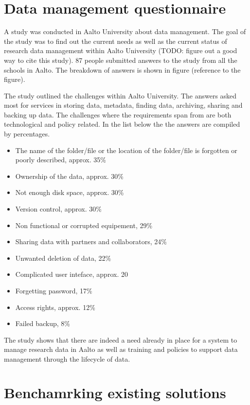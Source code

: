 \section{Data management questionnaire}
\label{sec:questionnaire}

A study was conducted in Aalto University about data management. The goal of
the study was to find out the current needs as well as the current status of
research data management within Aalto University (TODO: figure out a good way
to cite this study). 87 people submitted answers to the study from all the
schools in Aalto. The breakdown of answers is shown in figure (reference to the
figure).

The study outlined the challenges within Aalto University. The answers asked
most for services in storing data, metadata, finding data, archiving, sharing
and backing up data. The challenges where the requirements span from are both
technological and policy related. In the list below the the answers are
compiled by percentages.

\begin{itemize}
    \item The name of the folder/file or the location of the folder/file is
          forgotten or poorly described, approx. 35\%
    \item Ownership of the data, approx. 30\%
    \item Not enough disk space, approx. 30\%
    \item Version control, approx. 30\%
    \item Non functional or corrupted equipement, 29\%
    \item Sharing data with partners and collaborators, 24\%
    \item Unwanted deletion of data, 22\%
    \item Complicated user inteface, approx. 20%
    \item Forgetting password, 17\%
    \item Access rights, approx. 12\%
    \item Failed backup, 8\%
\end{itemize}

The study shows that there are indeed a need already in place for a system to
manage research data in Aalto as well as training and policies to support data
management through the lifecycle of data.

\section{Benchamrking existing solutions}
\label{sec:benchmarking}

